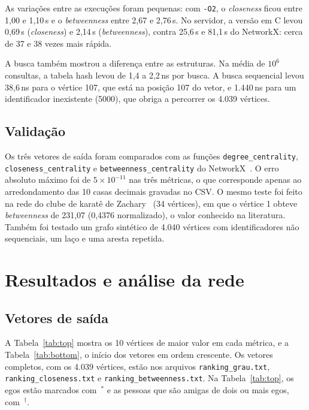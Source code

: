\documentclass[conference]{IEEEtran}
\begin{document}
As variações entre as execuções foram pequenas: com \texttt{-O2}, o \textit{closeness} ficou entre 1,00 e 1,10\,s e o \textit{betweenness} entre 2,67 e 2,76\,s. No servidor, a versão em C levou 0,69\,s (\textit{closeness}) e 2,14\,s (\textit{betweenness}), contra 25,6\,s e 81,1\,s do NetworkX: cerca de 37 e 38 vezes mais rápida.

A busca também mostrou a diferença entre as estruturas. Na média de $10^6$ consultas, a tabela hash levou de 1,4 a 2,2\,ns por busca. A busca sequencial levou 38,6\,ns para o vértice 107, que está na posição 107 do vetor, e 1.440\,ns para um identificador inexistente (5000), que obriga a percorrer os 4.039 vértices.

\subsection{Validação}

Os três vetores de saída foram comparados com as funções \texttt{degree\_\allowbreak centrality}, \texttt{closeness\_\allowbreak centrality} e \texttt{betweenness\_\allowbreak centrality} do NetworkX~\cite{networkx2008}. O erro absoluto máximo foi de $5\times10^{-11}$ nas três métricas, o que corresponde apenas ao arredondamento das 10 casas decimais gravadas no CSV. O mesmo teste foi feito na rede do clube de karatê de Zachary~\cite{zachary1977} (34 vértices), em que o vértice 1 obteve \textit{betweenness} de 231,07 (0,4376 normalizado), o valor conhecido na literatura. Também foi testado um grafo sintético de 4.040 vértices com identificadores não sequenciais, um laço e uma aresta repetida.

\section{Resultados e análise da rede}\label{sec:res}

\subsection{Vetores de saída}

A Tabela~\ref{tab:top} mostra os 10 vértices de maior valor em cada métrica, e a Tabela~\ref{tab:bottom}, o início dos vetores em ordem crescente. Os vetores completos, com os 4.039 vértices, estão nos arquivos \texttt{ranking\_\allowbreak grau.txt}, \texttt{ranking\_\allowbreak closeness.txt} e \texttt{ranking\_\allowbreak betweenness.txt}. Na Tabela~\ref{tab:top}, os egos estão marcados com~$^*$ e as pessoas que são amigas de dois ou mais egos, com~$^\dagger$.
\end{document}
